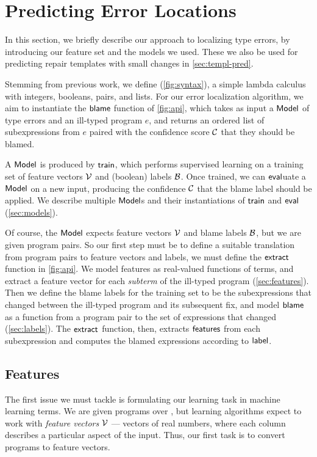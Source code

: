 
\section{Predicting Error Locations}
\label{sec:localization}

In this section, we briefly describe our approach to localizing type errors, by
introducing our feature set and the models we used. These we also be used for
predicting repair templates with small changes in \autoref{sec:templ-pred}.

Stemming from previous work, we define \lang (\autoref{fig:syntax}), a simple
lambda calculus with integers, booleans, pairs, and lists. For our error
localization algorithm, we aim to instantiate the $\mathsf{blame}$ function of
\autoref{fig:api}, which takes as input a $\mathsf{Model}$ of type errors and an
ill-typed program $e$, and returns an ordered list of subexpressions from $e$
paired with the confidence score $\mathcal{C}$ that they should be blamed.

A $\mathsf{Model}$ is produced by $\mathsf{train}$, which performs supervised learning on a
training set of feature vectors $\mathcal{V}$ and (boolean) labels $\mathcal{B}$. Once trained, we
can $\mathsf{eval}$uate a $\mathsf{Model}$ on a new input, producing the confidence $\mathcal{C}$
that the blame label should be applied. We describe multiple $\mathsf{Model}$s and their
instantiations of $\mathsf{train}$ and $\mathsf{eval}$ (\autoref{sec:models}).

Of course, the $\mathsf{Model}$ expects feature vectors $\mathcal{V}$ and blame labels $\mathcal{B}$, but
we are given program pairs. So our first step must be to define a suitable
translation from program pairs to feature vectors and labels, \ie we must define
the $\mathsf{extract}$ function in \autoref{fig:api}. We model features as
real-valued functions of terms, and extract a feature vector for each
\emph{subterm} of the ill-typed program (\autoref{sec:features}). Then we define
the blame labels for the training set to be the subexpressions that changed
between the ill-typed program and its subsequent fix, and model $\mathsf{blame}$ as a
function from a program pair to the set of expressions that changed
(\autoref{sec:labels}). The $\mathsf{extract}$ function, then, extracts $\mathsf{features}$
from each subexpression and computes the blamed expressions according to
$\mathsf{label}$.



\subsection{Features}
\label{sec:features}
The first issue we must tackle is formulating our learning task in machine
learning terms. We are given programs over \lang, but learning algorithms expect
to work with \emph{feature vectors} $\mathcal{V}$ --- vectors of real numbers, where each
column describes a particular aspect of the input. Thus, our first task is to
convert programs to feature vectors.

